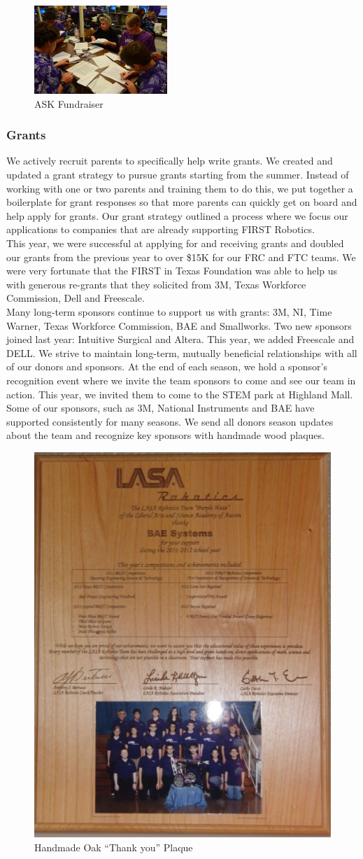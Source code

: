 \begin{figure}[H]
	\centering
	\includegraphics[width=0.4\linewidth]{ask}
	\caption[]{ASK Fundraiser}
	\label{fig:ask}
\end{figure}

\subsubsection{Grants}
We actively recruit parents to specifically help write grants.  We created and updated a grant strategy to pursue grants starting from the summer.  Instead of working with one or two parents and training them to do this, we put together a boilerplate for grant responses so that more parents can quickly get on board and help apply for grants.  Our grant strategy outlined a process where we focus our applications to companies that are already supporting FIRST Robotics.\\

This year, we were successful at applying for and receiving grants and doubled our grants from the previous year to over \$15K for our FRC and FTC teams.  We were very fortunate that the FIRST in Texas Foundation was able to help us with generous re-grants that they solicited from 3M, Texas Workforce Commission, Dell and Freescale.\\

Many long-term sponsors continue to support us with grants: 3M, NI, Time Warner, Texas Workforce Commission, BAE and Smallworks.  Two new sponsors joined last year: Intuitive Surgical and Altera. This year, we added Freescale and DELL.  We strive to maintain long-term, mutually beneficial relationships with all of our donors and sponsors.  At the end of each season, we hold a sponsor’s recognition event where we invite the team sponsors to come and see our team in action.  This year, we invited them to come to the STEM park at Highland Mall.  Some of our sponsors, such as 3M, National Instruments and BAE have supported consistently for many seasons.  We send all donors season updates about the team and recognize key sponsors with handmade wood plaques. 

\begin{figure}[H]
	\centering
	\includegraphics[width=0.3\linewidth]{thankyou}
	\caption[]{Handmade Oak “Thank you” Plaque}
	\label{fig:thankyou}
\end{figure}

